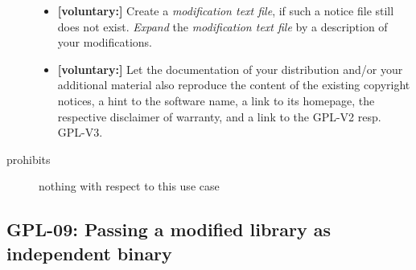 \begin{description}
\begin{itemize}
  \item \textbf{[voluntary:]} Create a \emph{modification text file}, if such a
  notice file still does not exist. \emph{Expand} the \emph{modification text
  file} by a description of your modifications.
  
  \item \textbf{[voluntary:]} Let the documentation of your distribution and/or
  your additional material also reproduce the content of the existing
  copyright notices, a hint to the software name, a link to its homepage,
  the respective disclaimer of warranty, and a link to the GPL-V2 resp.
  GPL-V3.

\end{itemize}

\item[prohibits] nothing with respect to this use case

\end{description}


\subsection{GPL-09: Passing a modified library as independent binary}
\label{OSUC-08B-GPL}

